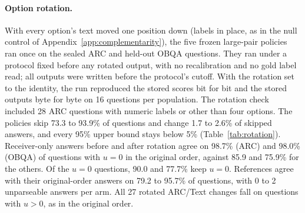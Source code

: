 \paragraph{Option rotation.} With every option's text moved one position down (labels in place, as in the null control of Appendix~\ref{app:complementarity}), the five frozen large-pair policies ran once on the sealed ARC and held-out OBQA questions. They ran under a protocol fixed before any rotated output, with no recalibration and no gold label read; all outputs were written before the protocol's cutoff. With the rotation set to the identity, the run reproduced the stored scores bit for bit and the stored outputs byte for byte on 16 questions per population. The rotation check included 28 ARC questions with numeric labels or other than four options. The policies skip 73.3 to 93.9\% of questions and change 1.7 to 2.6\% of skipped answers, and every 95\% upper bound stays below 5\% (Table~\ref{tab:rotation}). Receiver-only answers before and after rotation agree on 98.7\% (ARC) and 98.0\% (OBQA) of questions with $u=0$ in the original order, against 85.9 and 75.9\% for the others. Of the $u=0$ questions, 90.0 and 77.7\% keep $u=0$. References agree with their original-order answers on 79.2 to 95.7\% of questions, with 0 to 2 unparseable answers per arm. All 27 rotated ARC/Text changes fall on questions with $u>0$, as in the original order.

